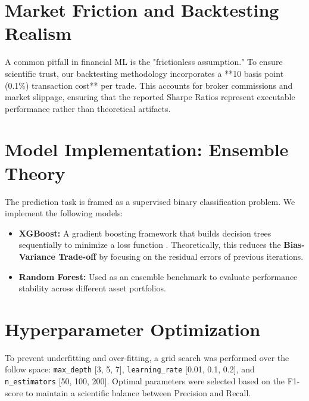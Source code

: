\section{Market Friction and Backtesting Realism}
A common pitfall in financial ML is the "frictionless assumption." To ensure scientific trust, our backtesting methodology incorporates a **10 basis point (0.1\%) transaction cost** per trade. This accounts for broker commissions and market slippage, ensuring that the reported Sharpe Ratios represent executable performance rather than theoretical artifacts.

\section{Model Implementation: Ensemble Theory}
The prediction task is framed as a supervised binary classification problem. We implement the following models:
\begin{itemize}
    \item \textbf{XGBoost:} A gradient boosting framework that builds decision trees sequentially to minimize a loss function \citep{chen2016}. Theoretically, this reduces the \textbf{Bias-Variance Trade-off} by focusing on the residual errors of previous iterations.
    \item \textbf{Random Forest:} Used as an ensemble benchmark to evaluate performance stability across different asset portfolios.
\end{itemize}

\section{Hyperparameter Optimization}
To prevent underfitting and over-fitting, a grid search was performed over the follow space: \texttt{max\_depth} [3, 5, 7], \texttt{learning\_rate} [0.01, 0.1, 0.2], and \texttt{n\_estimators} [50, 100, 200]. Optimal parameters were selected based on the F1-score to maintain a scientific balance between Precision and Recall.